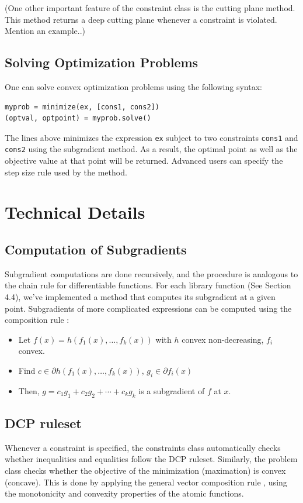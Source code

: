 \documentclass[12pt]{article}
\begin{document}
(One other important feature of the constraint class is the cutting plane
method. This method returns a deep cutting plane whenever a constraint is
violated. Mention an example..)


\subsection{Solving Optimization Problems}
One can solve convex optimization problems using the following syntax:
\begin{verbatim}
myprob = minimize(ex, [cons1, cons2])
(optval, optpoint) = myprob.solve()
\end{verbatim}
The lines above minimizes the expression \verb'ex' subject to two constraints
\verb'cons1' and \verb'cons2' using the subgradient method. As a result,
the optimal point as well as the objective value at that point will be
returned. Advanced users can specify the step size rule used by the
method.

\section{Technical Details}

\subsection{Computation of Subgradients}
Subgradient computations are done recursively, and the procedure is
analogous to the chain rule for differentiable functions. 
For each library function (See Section 4.4), we've implemented a method that computes 
its subgradient at a given point. 
Subgradients of more complicated expressions can be computed 
using the composition rule \cite{subg}:
\begin{itemize}
\item Let $f(x) = h(f_1(x), \ldots, f_k(x))$ with $h$ convex non-decreasing,
  $f_i$ convex.
\item Find $c \in \partial h(f_1(x), \ldots, f_k(x))$,  $g_i \in \partial
  f_i(x)$
\item Then, $g = c_1 g_1 + c_2 g_2 + \cdots + c_k g_k$ is a subgradient of $f$ at $x$.
\end{itemize}


\subsection{DCP ruleset}
Whenever a constraint is specified, the constraints class automatically checks whether inequalities
and equalities follow the DCP ruleset. Similarly, the problem class checks
whether the objective of the minimization (maximation) is convex (concave). This is done by applying the
general vector composition rule \cite{cvx}, using the monotonicity and
convexity properties of the atomic functions.
\end{document}
